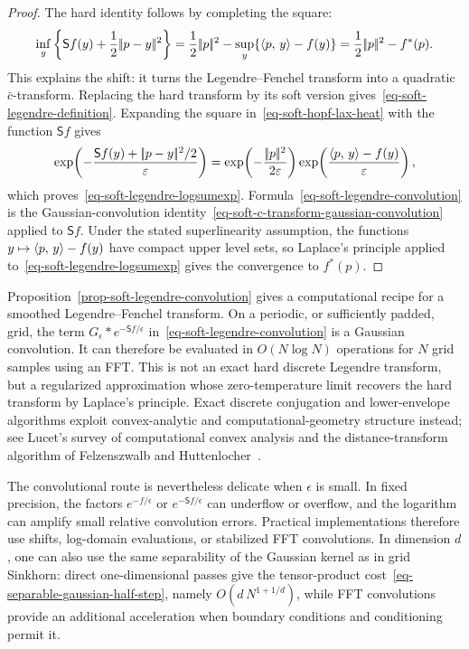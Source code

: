 \begin{proof}
The hard identity follows by completing the square:
\[
	\inf_y\left\{\mathsf S f(y)+\frac12|\!| p-y |\!|^2\right\}
	=
	\frac12|\!| p |\!|^2-
	\sup_y\{\langle p,\,y\rangle-f(y)\}
	=
	\frac12|\!| p |\!|^2-f^*(p).
\]
This explains the shift: it turns the Legendre--Fenchel transform into a quadratic $\bar c$-transform. Replacing the hard transform by its soft version gives~\eqref{eq-soft-legendre-definition}. Expanding the square in~\eqref{eq-soft-hopf-lax-heat} with the function $\mathsf S f$ gives
\[
	\exp\!\left(-\frac{\mathsf S f(y)+|\!| p-y |\!|^2/2}{\varepsilon}\right)
	=
	\exp\!\left(-\frac{|\!| p |\!|^2}{2\varepsilon}\right)
	\exp\!\left(\frac{\langle p,\,y\rangle-f(y)}{\varepsilon}\right),
\]
which proves~\eqref{eq-soft-legendre-logsumexp}. Formula~\eqref{eq-soft-legendre-convolution} is the Gaussian-convolution identity~\eqref{eq-soft-c-transform-gaussian-convolution} applied to $\mathsf S f$. Under the stated superlinearity assumption, the functions $y\mapsto\langle p,\,y\rangle-f(y)$ have compact upper level sets, so Laplace's principle applied to~\eqref{eq-soft-legendre-logsumexp} gives the convergence to $f^*(p)$.
\end{proof}

\begin{rem}\label{rem-soft-legendre-fft}
	Proposition~\ref{prop-soft-legendre-convolution} gives a computational recipe for a smoothed Legendre--Fenchel transform. On a periodic, or sufficiently padded, grid, the term $G_\epsilon\ast e^{-\mathsf S f/\epsilon}$ in~\eqref{eq-soft-legendre-convolution} is a Gaussian convolution. It can therefore be evaluated in $O(N\log N)$ operations for $N$ grid samples using an FFT. This is not an exact hard discrete Legendre transform, but a regularized approximation whose zero-temperature limit recovers the hard transform by Laplace's principle. Exact discrete conjugation and lower-envelope algorithms exploit convex-analytic and computational-geometry structure instead; see Lucet's survey of computational convex analysis and the distance-transform algorithm of Felzenszwalb and Huttenlocher~\cite{Lucet2010ComputationalConvexAnalysis,FelzenszwalbHuttenlocher2012DistanceTransforms}.

	The convolutional route is nevertheless delicate when $\epsilon$ is small. In fixed precision, the factors $e^{-f/\epsilon}$ or $e^{-\mathsf S f/\epsilon}$ can underflow or overflow, and the logarithm can amplify small relative convolution errors. Practical implementations therefore use shifts, log-domain evaluations, or stabilized FFT convolutions. In dimension $d$, one can also use the same separability of the Gaussian kernel as in grid Sinkhorn: direct one-dimensional passes give the tensor-product cost~\eqref{eq-separable-gaussian-half-step}, namely $O(d\,N^{1+1/d})$, while FFT convolutions provide an additional acceleration when boundary conditions and conditioning permit it.
\end{rem}

